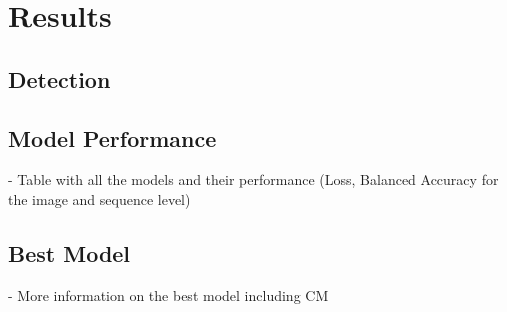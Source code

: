 

\section{Results}
\label{results}

\subsection{Detection}

\subsection{Model Performance}

- Table with all the models and their performance (Loss, Balanced Accuracy for the image and sequence level)

\subsection{Best Model}

- More information on the best model including CM